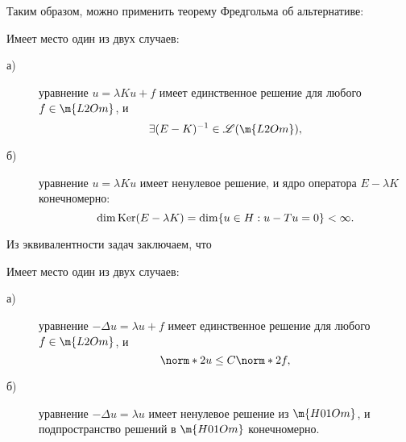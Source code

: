Таким образом, можно применить теорему Фредгольма об альтернативе:
\begin{note} Имеет место один из двух случаев:
\begin{description}
\item [а)] уравнение $u = \lambda K u + f$ имеет единственное решение для любого $f \in \m{L2Om}$, и $$ \exists (E -K)^{-1} \in \mathscr{L}(\m{L2Om}),$$
\item [б)] уравнение $u = \lambda K u$ имеет ненулевое решение, и ядро оператора $E - \lambda K$  конечномерно:
$$\dim \operatorname{Ker}(E - \lambda K) = \dim \{ u \in H : u - Tu = 0\} < \infty.$$
\end{description}
\end{note}
Из эквивалентности задач заключаем, что 
\begin{note} Имеет место один из двух случаев:
\begin{description}
\item [а)] уравнение $ - \Delta u = \lambda u + f$ имеет единственное решение для любого $f \in \m{L2Om}$, и 
$$ \norm*{2}{u} \leq C \norm*{2}{f},$$
\item [б)] уравнение $ - \Delta u = \lambda u $ имеет ненулевое решение из $\m{H01Om}$, и подпространство решений в $\m{H01Om}$ конечномерно. 
\end{description}
\end{note}